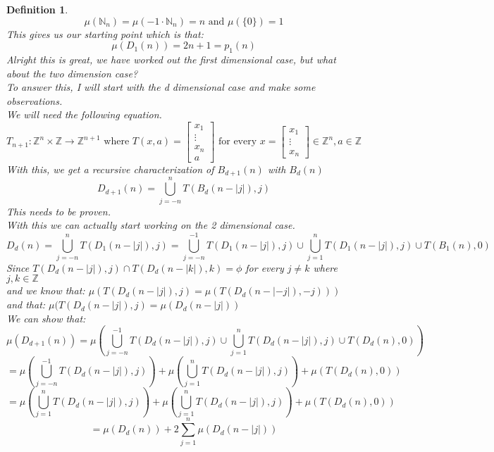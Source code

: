 \documentclass[12pt]{extarticle}
\theoremstyle{plain}
\theoremstyle{plain}
\theoremstyle{plain}
\theoremstyle{Definition}
\newtheorem{def.}{Definition}[section]
\theoremstyle{Definition}
\theoremstyle{plain}
\theoremstyle{plain}
\begin{document}
\begin{def.}
	$$\mu(\mathbb{N}_n) = \mu(-1\cdot\mathbb{N}_n) = n \text{ and } \mu(\{0\}) = 1$$
	This gives us our starting point which is that: \\ 
	$$\mu(D_1(n)) = 2n + 1 = p_1(n)$$
	Alright this is great, we have worked  out the first dimensional case, but what about the two dimension case? \\ 
	To answer this, I will start with the d dimensional case and make some observations. \\ 
	We will need the following equation. \\
	$$T_{n+1} : \mathbb{Z}^n \times \mathbb{Z} \to \mathbb{Z}^{n+1} \text{ where } T(x,a) = \begin{bmatrix}
	x_1 \\ 
	\vdots \\ 
	x_n \\ 
	a
	\end{bmatrix} \text{ for every } x = \begin{bmatrix}
	x_1 \\ 
	\vdots \\
	x_n
	\end{bmatrix} \in \mathbb{Z}^n, a \in \mathbb{Z}$$
	With this, we get a recursive characterization of $B_{d+1}(n)$ with  $B_{d}(n)$
	$$D_{d+1}(n) = \bigcup_{j=-n}^n T(B_{d}(n-|j|),j )$$
	This needs to be proven. \\ 
	With this we can actually start working on the 2 dimensional case. \\ 
	$$D_{d}(n) = \bigcup_{j=-n}^n T(D_{1}(n-|j|),j ) = \bigcup_{j=-n}^{-1} T(D_{1}(n-|j|),j ) \cup \bigcup_{j=1}^n T(D_{1}(n-|j|),j ) \cup T(B_{1}(n),0 )$$
	Since $T(D_{d}(n-|j|),j ) \cap T(D_{d}(n-|k|),k ) = \phi$ for every $j \not = k$ where $j,k \in \mathbb{Z}$ \\
	and we know that: $\mu(T(D_{d}(n-|j|),j) = \mu(T(D_{d}(n-|-j|),-j )))$ \\
	and that: $\mu(T(D_{d}(n-|j|),j) = \mu(D_{d}(n-|j|))$ \\
	We can show that: \\ 
	$$\mu(D_{d+1}(n))  = \mu\left( \bigcup_{j=-n}^{-1} T(D_{d}(n-|j|),j ) \cup \bigcup_{j=1}^n T(D_{d}(n-|j|),j ) \cup T(D_{d}(n),0 ) \right)$$
	$$= \mu\left( \bigcup_{j=-n}^{-1} T(D_{d}(n-|j|),j ) \right) + \mu\left( \bigcup_{j=1}^n T(D_{d}(n-|j|),j ) \right) + \mu\left(  T(D_{d}(n),0 ) \right)$$
	$$= \mu\left( \bigcup_{j=1}^{n} T(D_{d}(n-|j|),j ) \right) + \mu\left( \bigcup_{j=1}^n T(D_{d}(n-|j|),j ) \right) + \mu\left(  T(D_{d}(n),0 ) \right)$$
	$$ = \mu(D_d(n)) + 2 \sum_{j=1}^n \mu(D_{d}(n-|j|))$$

\end{def.}
\end{document}
